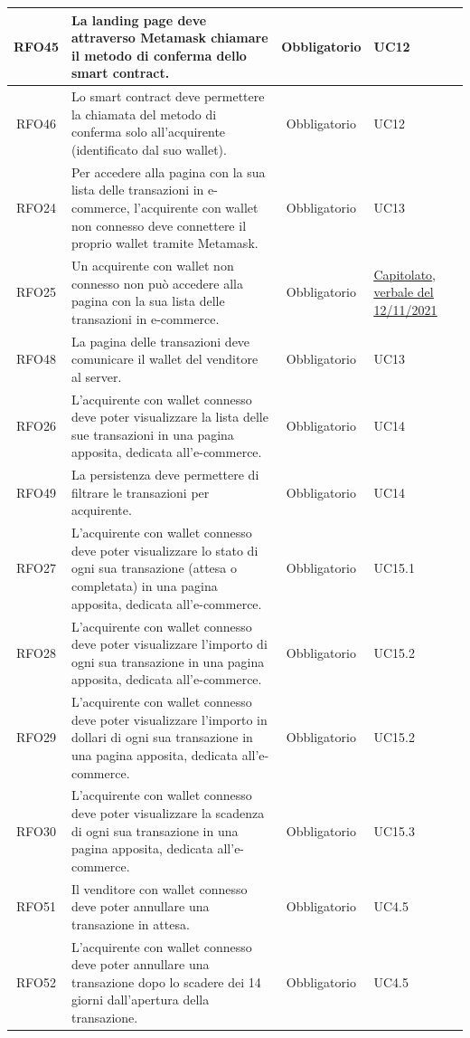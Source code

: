 \documentclass[a4paper, 12pt]{article}
\begin{document}
\begin{longtable}{|c|p{7cm}|c|p{4cm}|}
\hline
RFO45 & La landing page deve attraverso Metamask chiamare il metodo di conferma dello smart contract. & Obbligatorio & UC12 \\
\hline
RFO46 & Lo smart contract deve permettere la chiamata del metodo di conferma solo all'acquirente (identificato dal suo wallet). & Obbligatorio & UC12 \\
\hline
RFO24 & Per accedere alla pagina con la sua lista delle transazioni in e-commerce, l'acquirente con wallet non connesso deve connettere il proprio wallet tramite Metamask. & Obbligatorio & UC13 \\
\hline
RFO25 & Un acquirente con wallet non connesso non può accedere alla pagina con la sua lista delle transazioni in e-commerce. & Obbligatorio & \underline{\href{https://www.math.unipd.it/~tullio/IS-1/2021/Progetto/C2.pdf}{Capitolato}}, \underline{\href{https://github.com/iota97/WinningSoftwareSolution/blob/main/public/interni/verbali/2021_11_12_I.pdf}{verbale del 12/11/2021}} \\
\hline
RFO48 & La pagina delle transazioni deve comunicare il wallet del venditore al server. & Obbligatorio & UC13\\
\hline
RFO26 & L'acquirente con wallet connesso deve poter visualizzare la lista delle sue transazioni in una pagina apposita, dedicata all'e-commerce. & Obbligatorio & UC14 \\
\hline
RFO49 & La persistenza deve permettere di filtrare le transazioni per acquirente. & Obbligatorio & UC14 \\
\hline
RFO27 & L'acquirente con wallet connesso deve poter visualizzare lo stato di ogni sua transazione (attesa o completata) in una pagina apposita, dedicata all'e-commerce. & Obbligatorio & UC15.1 \\
\hline
RFO28 & L'acquirente con wallet connesso deve poter visualizzare l'importo di ogni sua transazione in una pagina apposita, dedicata all'e-commerce. & Obbligatorio & UC15.2 \\
\hline
RFO29 & L'acquirente con wallet connesso deve poter visualizzare l'importo in dollari di ogni sua transazione in una pagina apposita, dedicata all'e-commerce. & Obbligatorio & UC15.2 \\
\hline
RFO30 & L'acquirente con wallet connesso deve poter visualizzare la scadenza di ogni sua transazione in una pagina apposita, dedicata all'e-commerce. & Obbligatorio & UC15.3 \\
\hline
RFO51 & Il venditore con wallet connesso deve poter annullare una transazione in attesa. & Obbligatorio & UC4.5 \\
\hline
RFO52 & L'acquirente con wallet connesso deve poter annullare una transazione dopo lo scadere dei 14 giorni dall'apertura della transazione. & Obbligatorio & UC4.5 \\
\hline

\end{longtable}
\pagebreak
\end{document}
